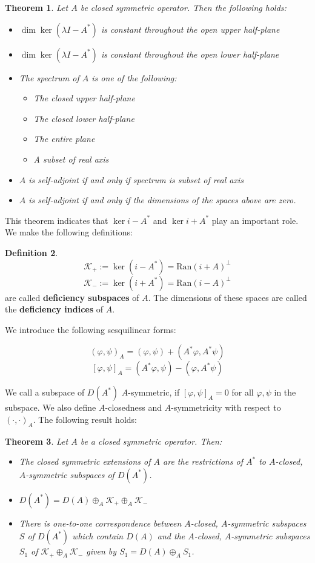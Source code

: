 \documentclass[11pt, a4paper, german]{article}
\theoremstyle{plain}
\newtheorem{theorem}{Theorem}
\theoremstyle{definition}
\newtheorem{definition}[theorem]{Definition}
\theoremstyle{remark}
\numberwithin{equation}{section}
\numberwithin{theorem}{section}
\begin{document}
\begin{theorem}
Let $A$ be closed symmetric operator. Then the following holds:
\begin{itemize}
\item $\dim \ker (\lambda I - A^*)$ is constant throughout the open upper half-plane
\item $\dim \ker (\lambda I - A^*)$ is constant throughout the open lower half-plane
\item The spectrum of $A$ is one of the following: 
	\begin{itemize}
	\item The closed upper half-plane
	\item The closed lower half-plane
	\item The entire plane
	\item A subset of real axis
	\end{itemize}
\item $A$ is self-adjoint if and only if spectrum is subset of real axis
\item $A$ is self-adjoint if and only if the dimensions of the spaces above are zero.
\end{itemize}
\end{theorem}

This theorem indicates that $\ker i - A^*$ and $\ker i + A^*$ play an important role. We make the following definitions:

\begin{definition}
$$\mathcal{K}_+:=\ker (i-A^*) = \text{Ran}(i+A)^{\perp}$$
$$\mathcal{K}_-:=\ker (i+A^*) = \text{Ran}(i-A)^{\perp}$$
are called \textbf{deficiency subspaces} of $A$. The dimensions of these spaces are called the \textbf{deficiency indices} of $A$.

\end{definition}

We introduce the following sesquilinear forms:

$$(\varphi, \psi)_A = (\varphi, \psi) + (A^*\varphi, A^*\psi)$$
$$[\varphi, \psi]_A = (A^*\varphi, \psi) - (\varphi, A^*\psi)$$

We call a subspace of $D(A^*)$ $A$-symmetric, if $[\varphi, \psi]_A = 0$ for all $\varphi, \psi$ in the subspace. We also define $A$-closedness and $A$-symmetricity with respect to $(\cdot, \cdot)_A$. The following result holds:

\begin{theorem}
Let $A$ be a closed symmetric operator. Then:
\begin{itemize}
\item The closed symmetric extensions of $A$ are the restrictions of $A^*$ to $A$-closed, $A$-symmetric subspaces of $D(A^*)$.
\item $D(A^*) = D(A)\oplus_A \mathcal{K}_+ \oplus_A \mathcal{K}_-$
\item There is one-to-one correspondence between $A$-closed, $A$-symmetric subspaces $S$ of $D(A^*)$ which contain $D(A)$ and the $A$-closed, $A$-symmetric subspaces $S_1$ of $\mathcal{K}_+\oplus_A\mathcal{K}_-$ given by $S_1 = D(A) \oplus_A S_1$.
\end{itemize}
\end{theorem}
\end{document}
